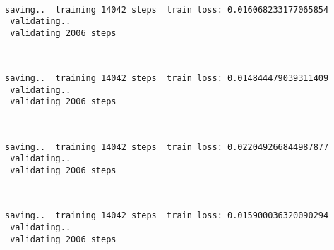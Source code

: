 \documentclass[11pt]{article}
\begin{document}
    \begin{center}
    \end{center}
    { \hspace*{\fill} \\}
    
    \begin{Verbatim}[commandchars=\\\{\}]
 saving..  training 14042 steps  train loss: 0.016068233177065854
 validating..
 validating 2006 steps
    \end{Verbatim}

    \begin{center}
    \end{center}
    { \hspace*{\fill} \\}
    
    \begin{Verbatim}[commandchars=\\\{\}]
 saving..  training 14042 steps  train loss: 0.014844479039311409
 validating..
 validating 2006 steps
    \end{Verbatim}

    \begin{center}
    \end{center}
    { \hspace*{\fill} \\}
    
    \begin{Verbatim}[commandchars=\\\{\}]
 saving..  training 14042 steps  train loss: 0.022049266844987877
 validating..
 validating 2006 steps
    \end{Verbatim}

    \begin{center}
    \end{center}
    { \hspace*{\fill} \\}
    
    \begin{Verbatim}[commandchars=\\\{\}]
 saving..  training 14042 steps  train loss: 0.015900036320090294
 validating..
 validating 2006 steps
    \end{Verbatim}
\end{document}
